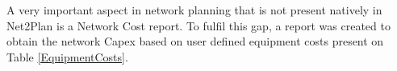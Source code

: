 %	
%	
%	
%	
%	
	
	A very important aspect in network planning that is not present natively in Net2Plan is a Network Cost report. To fulfil this gap, a report was created to obtain the network Capex based on user defined equipment costs present on Table \ref{EquipmentCosts}.
		
	\begin{table} [h]
		\centering
		\caption{Equipment Costs}			
		\label{EquipmentCosts}			
	\end{table}
	
